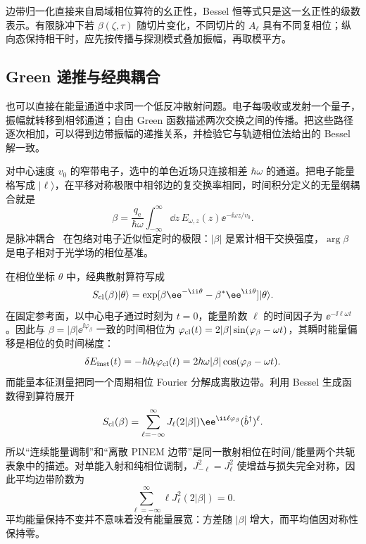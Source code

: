 边带归一化直接来自局域相位算符的幺正性，Bessel 恒等式只是这一幺正性的级数表示。有限脉冲下若 $\beta(\zeta,\tau)$ 随切片变化，不同切片的 $A_\ell$ 具有不同复相位；纵向态保持相干时，应先按传播与探测模式叠加振幅，再取模平方。



\subsection{Green 递推与经典耦合}

也可以直接在能量通道中求同一个低反冲散射问题。电子每吸收或发射一个量子，振幅就转移到相邻通道；自由 Green 函数描述两次交换之间的传播。把这些路径逐次相加，可以得到边带振幅的递推关系，并检验它与轨迹相位法给出的 Bessel 解一致。

对中心速度 $v_0$ 的窄带电子，选中的单色近场只连接相差 $\hbar\omega$ 的通道。把电子能量格写成 $|\ell\rangle$，在平移对称极限中相邻边的复交换率相同，时间积分定义的无量纲耦合就是
\begin{equation}
{
\beta
=\frac{q_{\mathrm e}}{\hbar\omega}
\int_{-\infty}^{\infty}\dd z\,
E_{\omega,z}(z)\ee^{-\ii\omega z/v_0}.}
\label{eq:beta_master}
\end{equation}
 是脉冲耦合~ 在包络对电子近似恒定时的极限：$|\beta|$ 是累计相干交换强度，$\arg\beta$ 是电子相对于光学场的相位基准。

在相位坐标 $\theta$ 中，经典散射算符写成
\begin{equation*}
S_{\rm cl}(\beta)|\theta\rangle
=\exp[\beta \ee^{-\ii\theta}-\beta^*\ee^{\ii\theta}]|\theta\rangle.
\end{equation*}
在固定参考面，以中心电子通过时刻为 $t=0$，能量阶数 $\ell$ 的时间因子为 $\ee^{-\ii\ell\omega t}$。因此与 $\beta=|\beta|\ee^{\ii\varphi_\beta}$ 一致的时间相位为 $\varphi_{\rm cl}(t)=2|\beta|\sin(\varphi_\beta-\omega t)$，其瞬时能量偏移是相位的负时间梯度：
\begin{equation}
{
\delta E_{\rm inst}(t)
=-\hbar\partial_t\varphi_{\rm cl}(t)
=2\hbar\omega|\beta|\cos(\varphi_\beta-\omega t).}
\label{eq:classical_energy_mod_from_beta}
\end{equation}
而能量本征测量把同一个周期相位 Fourier 分解成离散边带。利用 Bessel 生成函数得到算符展开
\begin{equation}
{
S_{\rm cl}(\beta)
=\sum_{\ell=-\infty}^{\infty}
J_\ell(2|\beta|)\ee^{\ii\ell\varphi_\beta}(\hat b^\dagger)^\ell.}
\label{eq:pinem_fourier_expansion}
\end{equation}
所以“连续能量调制”和“离散 PINEM 边带”是同一散射相位在时间/能量两个共轭表象中的描述。对单能入射和纯相位调制，$J_{-\ell}^2=J_{\ell}^2$ 使增益与损失完全对称，因此平均边带阶数为
\begin{equation}
{\sum_{\ell=-\infty}^{\infty}\ell J_\ell^2(2|\beta|)=0.}
\label{eq:pinem_zero_mean}
\end{equation}
平均能量保持不变并不意味着没有能量展宽：方差随 $|\beta|$ 增大，而平均值因对称性保持零。

